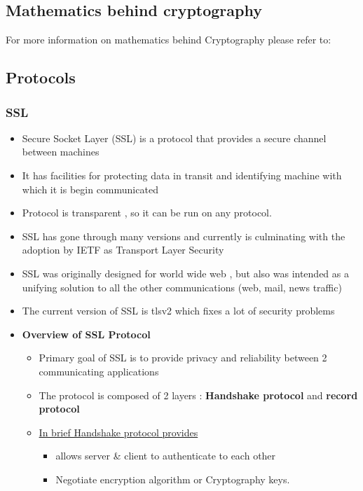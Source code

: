 \documentclass[12pt]{report}
\begin{document}
\subsection{Mathematics behind cryptography}
    For more information on mathematics behind Cryptography please refer to: ~\cite{RedHat:huzaifs}
\subsection{Protocols}
\subsubsection{SSL}
    \begin{itemize}
        \item Secure Socket Layer (SSL) is a protocol that provides a secure channel between machines
        \item It has facilities for protecting data in transit and identifying machine with which it is begin communicated
        \item Protocol is transparent , so it can be run on any protocol. 
        \item SSL has gone through many versions and currently is culminating with the adoption by IETF as Transport Layer Security
        \item SSL was originally designed for world wide web , but also was intended as a unifying solution to all the other communications (web, mail, news traffic)
        \item The current version of SSL is tlsv2 which fixes a lot of security problems
        \item \textbf{Overview of SSL Protocol}
            \begin{itemize}
                \item Primary goal of SSL is to provide privacy and reliability between 2 communicating applications
                \item The protocol is composed of 2 layers : \textbf{Handshake protocol} and \textbf{record protocol}
                \item \underline{In brief Handshake protocol provides}
                    \begin{itemize}
                        \item allows server \& client to authenticate to each other
                        \item Negotiate encryption algorithm or Cryptography keys. 
                    \end{itemize}

\end{itemize}
\end{itemize}
\end{document}
